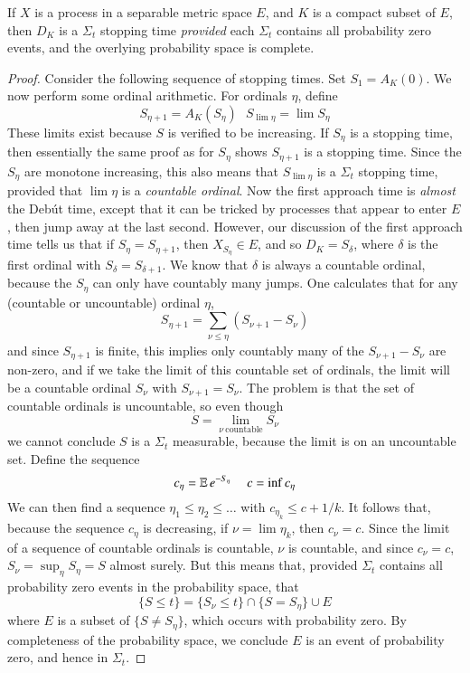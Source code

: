 \begin{theorem}
    If $X$ is a \cadlag process in a separable metric space $E$, and $K$ is a compact subset of $E$, then $D_K$ is a $\Sigma_t$ stopping time {\it provided} each $\Sigma_t$ contains all probability zero events, and the overlying probability space is complete.
\end{theorem}
\begin{proof}
    Consider the following sequence of stopping times. Set $S_1 = A_K(0)$. We now perform some ordinal arithmetic. For ordinals $\eta$, define
    \[ S_{\eta+1} = A_K(S_\eta)\ \ \ S_{\lim \eta} = \lim S_\eta \]
    These limits exist because $S$ is verified to be increasing. If $S_\eta$ is a stopping time, then essentially the same proof as for $S_\eta$ shows $S_{\eta + 1}$ is a stopping time. Since the $S_\eta$ are monotone increasing, this also means that $S_{\lim \eta}$ is a $\Sigma_t$ stopping time, provided that $\lim \eta$ is a {\it countable ordinal}. Now the first approach time is {\it almost} the Deb\'{u}t time, except that it can be tricked by processes that appear to enter $E$, then jump away at the last second. However, our discussion of the first approach time tells us that if $S_\eta = S_{\eta + 1}$, then $X_{S_\eta} \in E$, and so $D_K = S_{\delta}$, where $\delta$ is the first ordinal with $S_\delta = S_{\delta + 1}$. We know that $\delta$ is always a countable ordinal, because the $S_\eta$ can only have countably many jumps. One calculates that for any (countable or uncountable) ordinal $\eta$,
    \[ S_{\eta + 1} = \sum_{\nu \leq \eta} (S_{\nu + 1} - S_\nu) \]
    and since $S_{\eta + 1}$ is finite, this implies only countably many of the $S_{\nu + 1} - S_\nu$ are non-zero, and if we take the limit of this countable set of ordinals, the limit will be a countable ordinal $S_\nu$ with $S_{\nu + 1} = S_\nu$. The problem is that the set of countable ordinals is uncountable, so even though
    \[ S = \lim_{\nu\ \text{countable}} S_\nu \]
    we cannot conclude $S$ is a $\Sigma_t$ measurable, because the limit is on an uncountable set. Define the sequence
    \[ c_\eta = \EE e^{- S_\eta}\ \ \ \ \ c = \inf c_\eta \]
    We can then find a sequence $\eta_1 \leq \eta_2 \leq \dots$ with $c_{\eta_k} \leq c + 1/k$. It follows that, because the sequence $c_\eta$ is decreasing, if $\nu = \lim \eta_k$, then $c_{\nu} = c$. Since the limit of a sequence of countable ordinals is countable, $\nu$ is countable, and since $c_\nu = c$, $S_\nu = \sup_\eta S_\eta = S$ almost surely. But this means that, provided $\Sigma_t$ contains all probability zero events in the probability space, that
    \[ \{ S \leq t \} = \{ S_\nu \leq t \} \cap \{ S = S_\eta \} \cup E \]
    where $E$ is a subset of $\{ S \neq S_\eta \}$, which occurs with probability zero. By completeness of the probability space, we conclude $E$ is an event of probability zero, and hence in $\Sigma_t$.
\end{proof}

